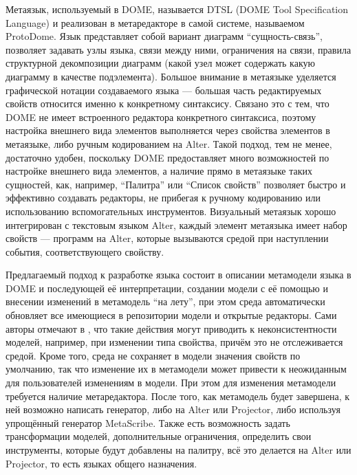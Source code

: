Метаязык, используемый в DOME, называется DTSL (DOME Tool Specification Language) и реализован в 
метаредакторе в самой системе, называемом ProtoDome. Язык представляет собой вариант диаграмм "`сущность-связь"', позволяет задавать узлы языка,
связи между ними, ограничения на связи, правила структурной декомпозиции диаграмм
(какой узел может содержать какую диаграмму в качестве подэлемента). Большое внимание
в метаязыке уделяется графической нотации создаваемого языка --- большая часть редактируемых свойств
относится именно к конкретному синтаксису. Связано это с тем, что DOME не имеет встроенного
редактора конкретного синтаксиса, поэтому настройка внешнего вида элементов выполняется через
свойства элементов в метаязыке, либо ручным кодированием на Alter. Такой подход, тем не менее,
достаточно удобен, поскольку DOME предоставляет много возможностей по настройке внешнего вида элементов,
а наличие прямо в метаязыке таких сущностей, как, например, "`Палитра"' или "`Список свойств"' позволяет быстро
и эффективно создавать редакторы, не прибегая к ручному кодированию или использованию вспомогательных
инструментов. Визуальный метаязык хорошо интегрирован с текстовым языком Alter, каждый
элемент метаязыка имеет набор свойств --- программ на Alter, которые вызываются средой при 
наступлении события, соответствующего свойству.

Предлагаемый подход к разработке языка состоит в описании метамодели языка в DOME и последующей
её интерпретации, создании модели с её помощью и внесении изменений в метамодель "`на лету"',
при этом среда автоматически обновляет все имеющиеся в репозитории модели и открытые редакторы.
Сами авторы отмечают в \cite{guide1999honeywell}, что такие действия могут приводить к 
неконсистентности моделей, например, при изменении типа свойства, причём это не отслеживается средой.
Кроме того, среда не сохраняет в модели значения свойств по умолчанию, так что изменение их в
метамодели может привести к неожиданным для пользователей изменениям в модели. При
этом для изменения метамодели требуется наличие метаредактора. После того, как метамодель
будет завершена, к ней возможно написать генератор, либо на Alter или Projector, либо используя
упрощённый генератор MetaScribe. Также есть возможность задать трансформации моделей, 
дополнительные ограничения, определить свои инструменты, которые будут добавлены на палитру,
всё это делается на Alter или Projector, то есть языках общего назначения.

